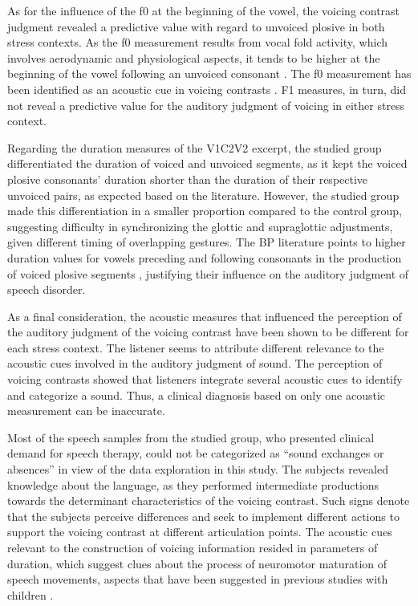 As for the influence of the f0 at the beginning of the vowel, the voicing
contrast judgment revealed a predictive value with regard to unvoiced plosive
in both stress contexts. As the f0 measurement results from vocal fold
activity, which involves aerodynamic and physiological aspects, it tends to be
higher at the beginning of the vowel following an unvoiced consonant \citep{shimizu1996}.
The f0 measurement has been identified as an acoustic cue in voicing
contrasts \citep{whalen1993,hanson2009,gregio2011}. F1
measures, in turn, did not reveal a predictive value for the auditory judgment
of voicing in either stress context.

Regarding the duration measures of the V1C2V2 excerpt, the studied group
differentiated the duration of voiced and unvoiced segments, as it kept the
voiced plosive consonants’ duration shorter than the duration of their
respective unvoiced pairs, as expected based on the literature. However, the
studied group made this differentiation in a smaller proportion compared to the
control group, suggesting  difficulty in synchronizing the glottic and
supraglottic adjustments, given different timing of overlapping gestures. The
BP literature points to higher duration values for vowels preceding and
following consonants in the production of voiced plosive segments \citep{barbosa1996,gurgueira2006,britto2010},
justifying their influence on the auditory judgment of speech disorder.

As a final consideration, the acoustic measures that influenced the perception
of the auditory judgment of the voicing contrast have been shown to be
different for each stress context. The listener seems to attribute different
relevance to the acoustic cues involved in the auditory judgment of sound. The
perception of voicing contrasts showed that listeners integrate several
acoustic cues to identify and categorize a sound. Thus, a clinical diagnosis
based on only one acoustic measurement can be inaccurate.

Most of the speech samples from the studied group, who presented clinical
demand for speech therapy, could not be categorized as “sound exchanges or
absences” in view of the data exploration in this study. The subjects revealed
knowledge about the language, as they performed intermediate productions
towards the determinant characteristics of the voicing contrast. Such signs
denote that the subjects perceive differences and seek to implement different
actions to support the voicing contrast at different articulation points. The
acoustic cues relevant to the construction of voicing information resided in
parameters of duration, which suggest clues about the process of neuromotor
maturation of speech movements, aspects that have been suggested in previous
studies with children \citep{levy1993,Gama-Rossi,albano2007}.

